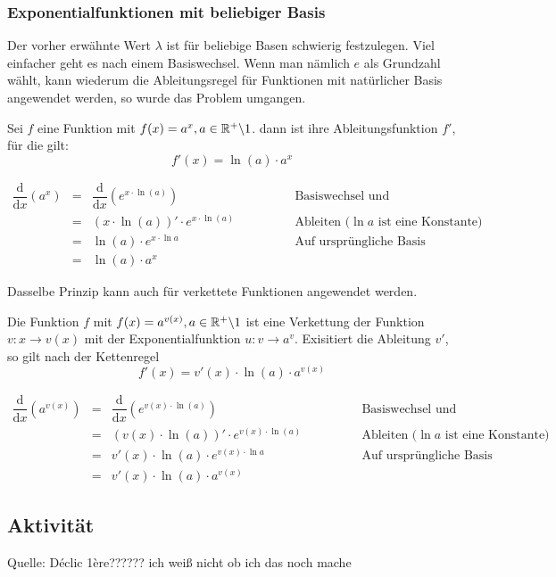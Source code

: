 \documentclass[main.tex]{subfiles}
\begin{document}
\subsubsection{Exponentialfunktionen mit beliebiger Basis}

Der vorher erwähnte Wert $\lambda$ ist für beliebige Basen schwierig festzulegen. Viel einfacher geht es nach einem Basiswechsel. Wenn man nämlich $e$ als Grundzahl wählt, kann wiederum die Ableitungsregel für Funktionen mit natürlicher Basis angewendet werden, so wurde das Problem umgangen.\\

\begin{Theorem}
	Sei $f$ eine Funktion mit $f(x)=a^x,a\in\mathbb{R}^+\backslash1$. dann ist ihre Ableitungsfunktion $f'$, für die gilt:
	$$f'(x)=\ln (a)\cdot a^x$$
\end{Theorem}

\begin{Beweis}
	$$\begin{array}{ccll}
		\dfrac{\text{d}}{\text{d}x}(a^x) &=&\dfrac{\text{d}}{\text{d}x}(e^{x\cdot\ln (a)})&\text{Basiswechsel und Kettenregel anwenden}\\
		&=&(x\cdot\ln (a))'\cdot e^{x\cdot\ln (a)}\qquad\qquad&\text{Ableiten (}\ln a\text{ ist eine Konstante)}\\
		&=&\ln (a) \cdot e^{x\cdot \ln a}&\text{Auf ursprüngliche Basis bringen}\\
		&=&\ln (a)\cdot a^x&
	\end{array}$$
\end{Beweis}


Dasselbe Prinzip kann auch für verkettete Funktionen angewendet werden.
\begin{Theorem}
	Die Funktion $f$ mit $f(x)=a^{v(x)},a\in\mathbb{R}^+\backslash1$ ist eine Verkettung der Funktion $v:x\rightarrow v(x)$ mit der Exponentialfunktion $u: v \rightarrow a^v$. Exisitiert die Ableitung $v'$, so gilt nach der Kettenregel\\
	$$f'(x)=v'(x)\cdot\ln (a)\cdot a^{v(x)}$$
\end{Theorem}

\begin{Beweis}
	$$\begin{array}{ccll}
		\dfrac{\text{d}}{\text{d}x}(a^{v(x)}) &=&\dfrac{\text{d}}{\text{d}x}(e^{v(x)\cdot\ln (a)})&\text{Basiswechsel und Kettenregel anwenden} \\
		& = & (v(x) \cdot \ln (a))' \cdot e^{v(x) \cdot \ln (a)} \qquad \qquad & \text{Ableiten ($\ln a$ ist eine Konstante)} \\
		& = & v'(x) \cdot \ln (a) \cdot e^{v(x) \cdot \ln a} & \text{Auf ursprüngliche Basis bringen} \\
		& = & v'(x) \cdot \ln (a) \cdot a^{v(x)}&
	\end{array}$$
\end{Beweis}
	\subsection{Aktivität}

Quelle: Déclic 1ère?????? ich weiß nicht ob ich das noch mache
\end{document}
